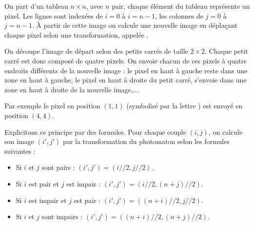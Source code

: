 \documentclass[11pt,class=report,crop=false]{standalone}
\begin{document}
\newcommand{\badletter}[1]{\underline{\textcolor{red}{#1}}}







\begin{cours}

On part d'un tableau $n\times n$, avec $n$ pair, chaque élément du tableau représente un pixel. Les lignes sont indexées de $i=0$ à $i=n-1$, les colonnes de $j=0$ à $j=n-1$.
À partir de cette image on calcule une nouvelle image en déplaçant chaque pixel selon une transformation, appelée .

On découpe l'image de départ selon des petits carrés de taille $2\times2$.
Chaque petit carré est donc composé de quatre pixels. On envoie chacun de ces pixels à quatre endroits différents de la nouvelle image :
le pixel en haut à gauche reste dans une zone en haut à gauche, le pixel en haut à droite du petit carré, s'envoie dans une zone en haut à droite de la nouvelle image,...


Par exemple le pixel en position $(1,1)$ (symbolisé par la lettre ) est envoyé en position $(4,4)$.

\medskip

Explicitons ce principe par des formules. Pour chaque couple $(i,j)$, on calcule son image $(i',j')$ par la transformation du photomaton selon les formules suivantes :
\begin{itemize}
  \item Si $i$ et $j$ sont pairs : $(i',j') = (i//2,j//2)$.
  \item Si $i$ est pair et $j$ est impair : $(i',j') = (i//2,(n+j)//2)$.  
  \item Si $i$ est impair et $j$ est pair : $(i',j') = ((n+i)//2,j//2)$.
  \item Si $i$ et $j$ sont impairs : $(i',j') = ((n+i)//2,(n+j)//2)$.
\end{itemize}



\end{cours}
\end{document}

